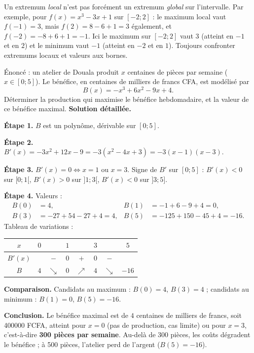 \documentclass[11pt]{article}
\begin{document}
\begin{attention}
Un extremum \emph{local} n'est pas forcément un extremum \emph{global} sur l'intervalle. Par exemple, pour $f(x) = x^3 - 3x + 1$ sur $[-2 ; 2]$ : le maximum local vaut $f(-1) = 3$, mais $f(2) = 8 - 6 + 1 = 3$ également, et $f(-2) = -8 + 6 + 1 = -1$. Ici le maximum sur $[-2;2]$ vaut $3$ (atteint en $-1$ et en $2$) et le minimum vaut $-1$ (atteint en $-2$ et en $1$). Toujours confronter extremums locaux et valeurs aux bornes.
\end{attention}

\begin{exoresolu}
Énoncé : un atelier de Douala produit $x$ centaines de pièces par semaine ($x \in [0 ; 5]$). Le bénéfice, en centaines de milliers de francs CFA, est modélisé par
\[ B(x) = -x^3 + 6x^2 - 9x + 4. \]
Déterminer la production qui maximise le bénéfice hebdomadaire, et la valeur de ce bénéfice maximal.
\tcblower
\textbf{Solution détaillée.}
\par\textbf{Étape 1.} $B$ est un polynôme, dérivable sur $[0 ; 5]$.
\par\textbf{Étape 2.} $B'(x) = -3x^2 + 12x - 9 = -3(x^2 - 4x + 3) = -3(x-1)(x-3)$.
\par\textbf{Étape 3.} $B'(x) = 0 \iff x = 1$ ou $x = 3$. Signe de $B'$ sur $[0 ; 5]$ : $B'(x) < 0$ sur $[0 ; 1[$, $B'(x) > 0$ sur $]1 ; 3[$, $B'(x) < 0$ sur $]3 ; 5]$.
\par\textbf{Étape 4.} Valeurs :
\begin{align*}
B(0) &= 4, & B(1) &= -1 + 6 - 9 + 4 = 0, \\
B(3) &= -27 + 54 - 27 + 4 = 4, & B(5) &= -125 + 150 - 45 + 4 = -16.
\end{align*}
Tableau de variations :
\begin{center}
\begin{tabular}{|c|ccccccc|}\hline
$x$ & $0$ & & $1$ & & $3$ & & $5$ \\ \hline
$B'(x)$ & & $-$ & $0$ & $+$ & $0$ & $-$ & \\ \hline
$B$ & $4$ & $\searrow$ & $0$ & $\nearrow$ & $4$ & $\searrow$ & $-16$ \\ \hline
\end{tabular}
\end{center}
\par\textbf{Comparaison.} Candidats au maximum : $B(0) = 4$, $B(3) = 4$ ; candidats au minimum : $B(1) = 0$, $B(5) = -16$.
\par\textbf{Conclusion.} Le bénéfice maximal est de $4$ centaines de milliers de francs, soit \SI{400000}{} FCFA, atteint pour $x = 0$ (pas de production, cas limite) ou pour $x = 3$, c'est-à-dire \textbf{300 pièces par semaine}. Au-delà de 300 pièces, les coûts dégradent le bénéfice ; à 500 pièces, l'atelier perd de l'argent ($B(5) = -16$).
\end{exoresolu}
\end{document}
